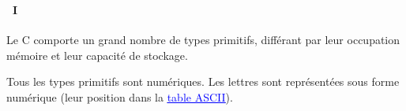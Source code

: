 \begin{frame}
  \frametitle{\secname}
  \framesubtitle{\subsecname~I}
  Le C comporte un grand nombre de types primitifs, différant par leur occupation mémoire et leur capacité de stockage.
  \vspace{0.5cm}
  \par
  Tous les types primitifs sont numériques. Les lettres sont représentées sous forme numérique 
  (leur position dans la \href{http://www.asciitable.com/index/asciifull.gif}{\textcolor{blue}{\underline{table ASCII}}}).
\end{frame}

